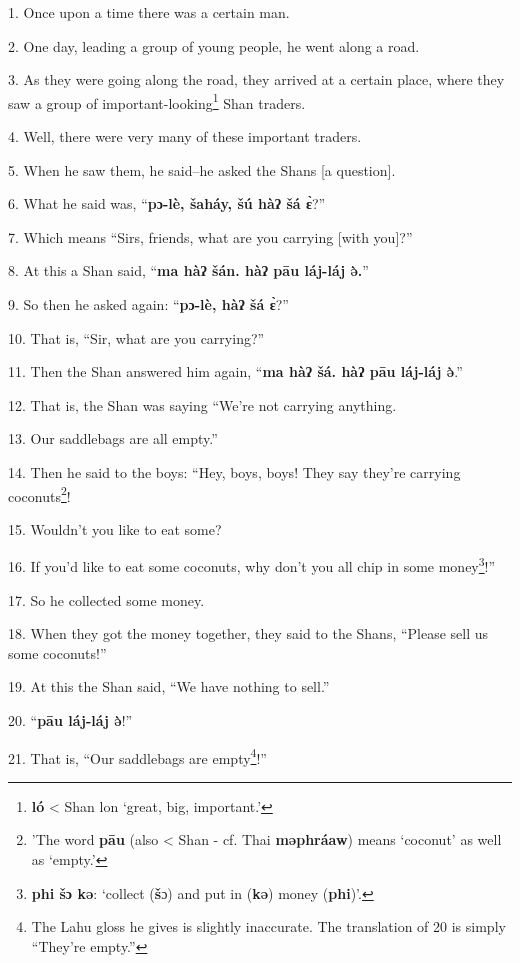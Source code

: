 \setcounter{footnote}{0}

1. Once upon a time there was a certain man.

2. One day, leading a group of young people, he went along a road.

3. As they were going along the road, they arrived at a certain place, where they saw a group of important-looking\footnote{\textbf{ló} < Shan lon `great, big, important.'} Shan traders.

4. Well, there were very many of these important traders.

5. When he saw them, he said--he asked the Shans [a question].

6. What he said was, ``\textbf{pɔ-lè, šaháy, šú hàʔ šá ɛ̀}?''

7. Which means ``Sirs, friends, what are you carrying [with you]?''

8. At this a Shan said, ``\textbf{ma hàʔ šán. hàʔ pāu láj-láj ə̀.}''

9. So then he asked again: ``\textbf{pɔ-lè, hàʔ šá ɛ̀}?''

10. That is, ``Sir, what are you carrying?''

11. Then the Shan answered him again, ``\textbf{ma hàʔ šá. hàʔ pāu láj-láj ə̀}.''

12. That is, the Shan was saying ``We're not carrying anything.

13. Our saddlebags are all empty.''

14. Then he said to the boys: ``Hey, boys, boys! They say they're carrying coconuts\footnote{'The word \textbf{pāu} (also < Shan - cf. Thai \textbf{məphráaw}) means `coconut' as well as `empty.'}!

15. Wouldn't you like to eat some?

16. If you'd like to eat some coconuts, why don't you all chip in some money\footnote{\textbf{phi šɔ kə}: `collect (\textbf{š}ɔ) and put in (\textbf{kə}) money (\textbf{phi})'.}!''

17. So he collected some money.

18. When they got the money together, they said to the Shans, ``Please sell us some coconuts!''

19. At this the Shan said, ``We have nothing to sell.''

20. ``\textbf{pāu láj-láj ə̀}!''

21. That is, ``Our saddlebags are empty\footnote{The Lahu gloss he gives is slightly inaccurate. The translation of 20 is simply ``They're empty.''}!''

